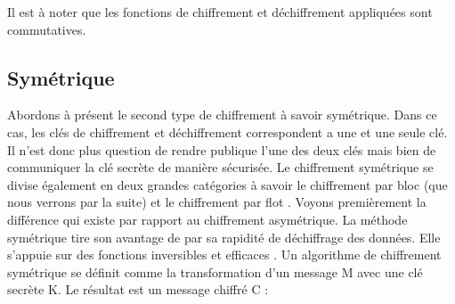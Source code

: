 \documentclass[letterpaper]{article}
\begin{document}
 \newline
Il est à noter que les fonctions de chiffrement et déchiffrement appliquées sont commutatives. 

\subsection{Symétrique}
Abordons à présent le second type de chiffrement à savoir symétrique. Dans ce cas, les clés de chiffrement et déchiffrement correspondent a une et une seule clé. Il n'est donc plus question de rendre publique l'une des deux clés mais bien de communiquer la clé secrète de manière sécurisée. Le chiffrement symétrique se divise également en deux grandes catégories à savoir le chiffrement par bloc (que nous verrons par la suite) et le chiffrement par flot \cite{ref9}. Voyons premièrement la différence qui existe par rapport au chiffrement asymétrique. La méthode symétrique tire son avantage de par sa rapidité de déchiffrage des données. Elle s'appuie sur des fonctions inversibles et efficaces \cite{ref9}. Un algorithme de chiffrement symétrique se définit comme la transformation d'un message M avec une clé secrète K. Le résultat est un message chiffré C :  \\
\end{document}
